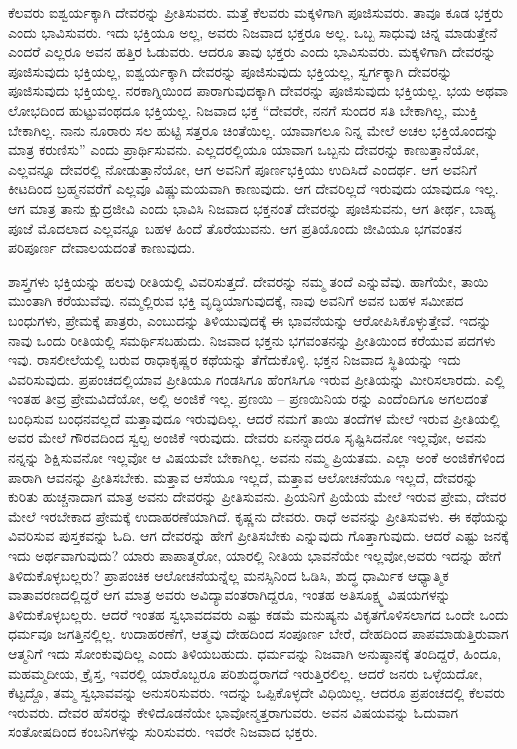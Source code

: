 ಕೆಲವರು ಐಶ್ವರ್ಯಕ್ಕಾಗಿ ದೇವರನ್ನು ಪ್ರೀತಿಸುವರು. ಮತ್ತೆ ಕೆಲವರು ಮಕ್ಕಳಿಗಾಗಿ ಪೂಜಿಸುವರು. ತಾವೂ ಕೂಡ ಭಕ್ತರು ಎಂದು ಭಾವಿಸುವರು. ಇದು ಭಕ್ತಿಯೂ ಅಲ್ಲ, ಅವರು ನಿಜವಾದ ಭಕ್ತರೂ ಅಲ್ಲ. ಒಬ್ಬ ಸಾಧುವು ಚಿನ್ನ ಮಾಡುತ್ತೇನೆ ಎಂದರೆ ಎಲ್ಲರೂ ಅವನ ಹತ್ತಿರ ಓಡುವರು. ಆದರೂ ತಾವು ಭಕ್ತರು ಎಂದು ಭಾವಿಸುವರು. ಮಕ್ಕಳಿಗಾಗಿ ದೇವರನ್ನು ಪೂಜಿಸುವುದು ಭಕ್ತಿಯಲ್ಲ, ಐಶ್ವರ್ಯಕ್ಕಾಗಿ ದೇವರನ್ನು ಪೂಜಿಸುವುದು ಭಕ್ತಿಯಲ್ಲ, ಸ್ವರ್ಗಕ್ಕಾಗಿ ದೇವರನ್ನು ಪೂಜಿಸುವುದು ಭಕ್ತಿಯಲ್ಲ. ನರಕಾಗ್ನಿಯಿಂದ ಪಾರಾಗುವುದಕ್ಕಾಗಿ ದೇವರನ್ನು ಪೂಜಿಸುವುದು ಭಕ್ತಿಯಲ್ಲ. ಭಯ ಅಥವಾ ಲೋಭದಿಂದ ಹುಟ್ಟುವಂಥದೂ ಭಕ್ತಿಯಲ್ಲ. ನಿಜವಾದ ಭಕ್ತ “ದೇವರೇ, ನನಗೆ ಸುಂದರ ಸತಿ ಬೇಕಾಗಿಲ್ಲ, ಮುಕ್ತಿ ಬೇಕಾಗಿಲ್ಲ. ನಾನು ನೂರಾರು ಸಲ ಹುಟ್ಟಿ ಸತ್ತರೂ ಚಿಂತೆಯಿಲ್ಲ. ಯಾವಾಗಲೂ ನಿನ್ನ ಮೇಲೆ ಅಚಲ ಭಕ್ತಿಯೊಂದನ್ನು ಮಾತ್ರ ಕರುಣಿಸು” ಎಂದು ಪ್ರಾರ್ಥಿಸುವನು. ಎಲ್ಲದರಲ್ಲಿಯೂ ಯಾವಾಗ ಒಬ್ಬನು ದೇವರನ್ನು ಕಾಣುತ್ತಾನೆಯೋ, ಎಲ್ಲವನ್ನೂ ದೇವರಲ್ಲಿ ನೋಡುತ್ತಾನೆಯೋ, ಆಗ ಅವನಿಗೆ ಪೂರ್ಣಭಕ್ತಿಯು ಉದಿಸಿದೆ ಎಂದರ್ಥ. ಆಗ ಅವನಿಗೆ ಕೀಟದಿಂದ ಬ್ರಹ್ಮನವರೆಗೆ ಎಲ್ಲವೂ ವಿಷ್ಣುಮಯವಾಗಿ ಕಾಣುವುದು. ಆಗ ದೇವರಿಲ್ಲದೆ ಇರುವುದು ಯಾವುದೂ ಇಲ್ಲ. ಆಗ ಮಾತ್ರ ತಾನು ಕ್ಷುದ್ರಜೀವಿ ಎಂದು ಭಾವಿಸಿ ನಿಜವಾದ ಭಕ್ತನಂತೆ ದೇವರನ್ನು ಪೂಜಿಸುವನು, ಆಗ ತೀರ್ಥ, ಬಾಹ್ಯ ಪೂಜೆ ಮೊದಲಾದ ಎಲ್ಲವನ್ನೂ ಬಹಳ ಹಿಂದೆ ತೊರೆಯುವನು. ಆಗ ಪ್ರತಿಯೊಂದು ಜೀವಿಯೂ ಭಗವಂತನ ಪರಿಪೂರ್ಣ ದೇವಾಲಯದಂತೆ ಕಾಣುವುದು.

ಶಾಸ್ತ್ರಗಳು ಭಕ್ತಿಯನ್ನು ಹಲವು ರೀತಿಯಲ್ಲಿ ವಿವರಿಸುತ್ತದೆ. ದೇವರನ್ನು ನಮ್ಮ ತಂದೆ ಎನ್ನುವೆವು. ಹಾಗೆಯೇ, ತಾಯಿ ಮುಂತಾಗಿ ಕರೆಯುವೆವು. ನಮ್ಮಲ್ಲಿರುವ ಭಕ್ತಿ ವೃದ್ಧಿಯಾಗುವುದಕ್ಕೆ, ನಾವು ಅವನಿಗೆ ಅವನ ಬಹಳ ಸಮೀಪದ ಬಂಧುಗಳು, ಪ್ರೇಮಕ್ಕೆ ಪಾತ್ರರು, ಎಂಬುದನ್ನು ತಿಳಿಯುವುದಕ್ಕೆ ಈ ಭಾವನೆಯನ್ನು ಆರೋಪಿಸಿಕೊಳ್ಳುತ್ತೇವೆ. ಇದನ್ನು ನಾವು ಒಂದು ರೀತಿಯಲ್ಲಿ ಸಮರ್ಥಿಸಬಹುದು. ನಿಜವಾದ ಭಕ್ತನು ಭಗವಂತನನ್ನು ಪ್ರೀತಿಯಿಂದ ಕರೆಯುವ ಪದಗಳು ಇವು. ರಾಸಲೀಲೆಯಲ್ಲಿ ಬರುವ ರಾಧಾಕೃಷ್ಣರ ಕಥೆಯನ್ನು ತೆಗೆದುಕೊಳ್ಳಿ. ಭಕ್ತನ ನಿಜವಾದ ಸ್ಥಿತಿಯನ್ನು ಇದು ವಿವರಿಸುವುದು. ಪ್ರಪಂಚದಲ್ಲಿ\break ಯಾವ ಪ್ರೀತಿಯೂ ಗಂಡಸಿಗೂ ಹೆಂಗಸಿಗೂ ಇರುವ ಪ್ರೀತಿಯನ್ನು ಮೀರಿಸ\-ಲಾರದು. ಎಲ್ಲಿ ಇಂತಹ ತೀವ್ರ ಪ್ರೇಮವಿದೆಯೋ, ಅಲ್ಲಿ ಅಂಜಿಕೆ ಇಲ್ಲ. ಪ್ರಣಯಿ – ಪ್ರಣಯಿನಿಯ ರನ್ನು ಎಂದೆಂದಿಗೂ ಅಗಲದಂತೆ ಬಂಧಿಸುವ ಬಂಧನವಲ್ಲದೆ ಮತ್ತಾವುದೂ ಇರುವುದಿಲ್ಲ. ಆದರೆ ನಮಗೆ ತಾಯಿ ತಂದೆಗಳ ಮೇಲೆ ಇರುವ ಪ್ರೀತಿಯಲ್ಲಿ ಅವರ ಮೇಲೆ ಗೌರವದಿಂದ ಸ್ವಲ್ಪ ಅಂಜಿಕೆ ಇರುವುದು. ದೇವರು ಏನನ್ನಾದರೂ ಸೃಷ್ಟಿಸಿದನೋ ಇಲ್ಲವೋ, ಅವನು ನನ್ನನ್ನು ಶಿಕ್ಷಿಸುವನೋ ಇಲ್ಲವೋ ಆ ವಿಷಯವೇ ಬೇಕಾಗಿಲ್ಲ. ಅವನು ನಮ್ಮ ಪ್ರಿಯತಮ. ಎಲ್ಲಾ ಅಂಕೆ ಅಂಜಿಕೆಗಳಿಂದ ಪಾರಾಗಿ ಆವನನ್ನು ಪ್ರೀತಿಸಬೇಕು. ಮತ್ತಾವ ಆಸೆಯೂ ಇಲ್ಲದೆ, ಮತ್ತಾವ ಆಲೋಚನೆಯೂ ಇಲ್ಲದೆ, ದೇವರನ್ನು ಕುರಿತು ಹುಚ್ಚನಾದಾಗ ಮಾತ್ರ ಅವನು ದೇವರನ್ನು ಪ್ರೀತಿಸುವನು. ಪ್ರಿಯನಿಗೆ ಪ್ರಿಯೆಯ ಮೇಲೆ ಇರುವ ಪ್ರೇಮ, ದೇವರ ಮೇಲೆ ಇರಬೇಕಾದ ಪ್ರೇಮಕ್ಕೆ ಉದಾಹರಣೆಯಾಗಿದೆ. ಕೃಷ್ಣನು ದೇವರು. ರಾಧೆ ಅವನನ್ನು ಪ್ರೀತಿಸುವಳು. ಈ ಕಥೆಯನ್ನು ವಿವರಿಸುವ ಪುಸ್ತಕವನ್ನು ಓದಿ. ಆಗ ದೇವರನ್ನು ಹೇಗೆ ಪ್ರೀತಿಸಬೇಕು ಎನ್ನುವುದು ಗೊತ್ತಾಗುವುದು. ಆದರೆ ಎಷ್ಟು ಜನಕ್ಕೆ ಇದು ಅರ್ಥವಾಗುವುದು? ಯಾರು ಪಾಪಾತ್ಮರೋ, ಯಾರಲ್ಲಿ ನೀತಿಯ ಭಾವನೆಯೇ ಇಲ್ಲವೋ,\break ಅವರು ಇದನ್ನು ಹೇಗೆ ತಿಳಿದುಕೊಳ್ಳಬಲ್ಲರು? ಪ್ರಾಪಂಚಿಕ ಆಲೋಚನೆ\-ಯನ್ನೆಲ್ಲ ಮನಸ್ಸಿನಿಂದ ಓಡಿಸಿ, ಶುದ್ಧ ಧಾರ್ಮಿಕ ಆಧ್ಯಾತ್ಮಿಕ ವಾತಾವರಣದಲ್ಲಿದ್ದರೆ ಆಗ ಮಾತ್ರ ಅವರು ಅವಿದ್ಯಾವಂತರಾಗಿದ್ದರೂ, ಇಂತಹ ಅತಿಸೂಕ್ಷ್ಮ ವಿಷಯ\break ಗಳನ್ನು ತಿಳಿದುಕೊಳ್ಳಬಲ್ಲರು. ಆದರೆ ಇಂತಹ ಸ್ವಭಾವದವರು ಎಷ್ಟು ಕಡಮೆ ಮನುಷ್ಯನು ವಿಕೃತಗೊಳಿಸಲಾಗದ ಒಂದೇ ಒಂದು ಧರ್ಮವೂ ಜಗತ್ತಿನಲ್ಲಿಲ್ಲ. ಉದಾಹರಣೆಗೆ, ಆತ್ಮವು ದೇಹದಿಂದ ಸಂಪೂರ್ಣ ಬೇರೆ, ದೇಹದಿಂದ ಪಾಪಮಾಡುತ್ತಿರುವಾಗ ಆತ್ಮನಿಗೆ ಇದು ಸೋಂಕುವುದಿಲ್ಲ ಎಂದು ತಿಳಿಯಬಹುದು. ಧರ್ಮವನ್ನು ನಿಜವಾಗಿ ಅನುಷ್ಠಾನಕ್ಕೆ ತಂದಿದ್ದರೆ, ಹಿಂದೂ, ಮಹಮ್ಮದೀಯ, ಕ್ರೈಸ್ತ, ಇವರಲ್ಲಿ ಯಾರೊಬ್ಬರೂ ಪರಿಶುದ್ಧರಾಗದೆ ಇರುತ್ತಿರಲಿಲ್ಲ. ಆದರೆ ಜನರು ಒಳ್ಳೆಯದೋ, ಕೆಟ್ಟದ್ದೊ, ತಮ್ಮ ಸ್ವಭಾವವನ್ನು ಅನುಸರಿಸುವರು. ಇದನ್ನು ಒಪ್ಪಿಕೊಳ್ಳದೇ ವಿಧಿಯಿಲ್ಲ. ಆದರೂ ಪ್ರಪಂಚದಲ್ಲಿ ಕೆಲವರು ಇರುವರು. ದೇವರ ಹೆಸರನ್ನು ಕೇಳಿದೊಡನೆಯೇ ಭಾವೋನ್ಮತ್ತರಾಗುವರು. ಅವನ ವಿಷಯವನ್ನು ಓದುವಾಗ ಸಂತೋಷದಿಂದ ಕಂಬನಿಗಳನ್ನು ಸುರಿಸುವರು. ಇವರೇ ನಿಜವಾದ ಭಕ್ತರು.


